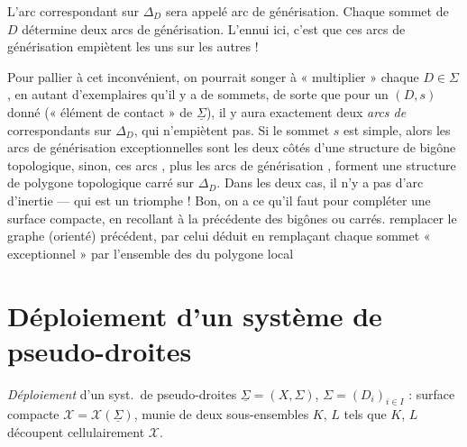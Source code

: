 \documentclass[11pt,a4paper]{article}
\begin{document}
L'arc correspondant sur $\Delta_D$ sera appelé arc de générisation. Chaque sommet de $D$ détermine deux arcs de générisation. L'ennui ici, c'est que ces arcs de générisation empiètent les uns sur les autres !

Pour pallier à cet inconvénient, on pourrait songer à « multiplier » chaque $D \in \Sigma$, en autant d'exemplaires qu'il y a de sommets, de sorte que  pour un $(D, s)$ donné (« élément de contact » de $\underline{\Sigma}$), il y aura exactement deux \emph{arcs de}    correspondants sur $\Delta_D$, qui n'empiètent pas. Si le sommet $s$ est simple, alors les  arcs de générisation exceptionnelles sont les deux côtés d'une structure de bigône topologique, sinon, ces  arcs , plus les  arcs de générisation , forment une structure de polygone topologique carré sur $\Delta_D$.  Dans les deux cas, il n'y a pas d'arc d'inertie ---  qui est un triomphe ! Bon, on a  ce qu'il faut pour compléter une surface compacte, en recollant à la précédente des bigônes ou carrés.    remplacer le graphe (orienté) précédent, par celui déduit en remplaçant chaque sommet « exceptionnel » par l'ensemble des   du polygone local

\section{Déploiement d'un système de pseudo-droites}

\emph{Déploiement} d'un syst.\ de pseudo-droites $\underline{\Sigma} = (X, \Sigma)$, $\Sigma = (D_i)_{i \in I}$ : surface compacte $\mathcal{X} = \mathcal{X}(\underline{\Sigma})$, munie de deux sous-ensembles $K$, $L$ tels que $K$, $L$ découpent cellulairement $\mathcal{X}$.
\end{document}
